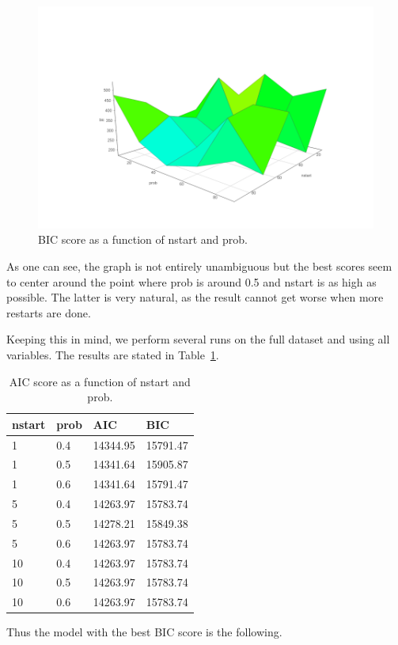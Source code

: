 \documentclass[12pt]{article}
\theoremstyle{definition}
\begin{document}
\begin{figure}[H]
    \centering
    \includegraphics[width=0.8\linewidth]{rough2.png}
    \caption{BIC score as a function of nstart and prob.}
\label{fig:rough}
\end{figure}

As one can see, the graph is not entirely unambiguous but the best scores seem to
center around the point where prob is around 0.5 and nstart is as high as possible.
The latter is very natural, as the result cannot get worse when more restarts are done.

Keeping this in mind, we perform several runs on the full dataset and using all variables.
The results are stated in Table~\ref{table1}.

\begin{table}[H]
\centering
\begin{tabular}{llll}
    nstart & prob & AIC & BIC \\
    \hline \hline
    1 & 0.4 & 14344.95 & 15791.47 \\
    1 & 0.5 & 14341.64 & 15905.87 \\
    1 & 0.6 & 14341.64 & 15791.47 \\
    5 & 0.4 & 14263.97 & 15783.74 \\
    5 & 0.5 & 14278.21 & 15849.38 \\
    5 & 0.6 & 14263.97 & 15783.74 \\
    10 & 0.4 & 14263.97 & 15783.74 \\
    10 & 0.5 & 14263.97 & 15783.74 \\
    10 & 0.6 & 14263.97 & 15783.74 \\
\end{tabular}
\caption{AIC score as a function of nstart and prob.}
\label{table1}
\end{table}

Thus the model with the best BIC score is the following.
\end{document}
